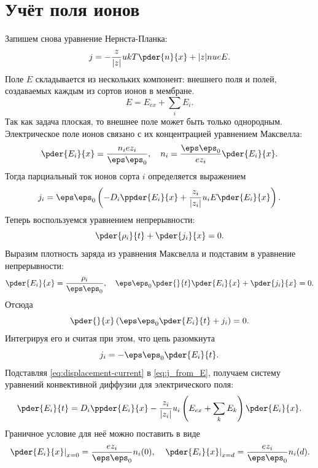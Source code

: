 \documentclass{hedwork}
\begin{document}
\section{Учёт поля ионов}
    Запишем снова уравнение Нернста-Планка:
    \begin{equation}
        j = -\frac{z}{|z|}ukT\pder{n}{x} + |z|nueE.
    \end{equation}
    Поле \( E \) складывается из нескольких компонент: внешнего поля и полей,
    создаваемых каждым из сортов ионов в мембране.
    \begin{equation}
        E = E_{ex} + \sum_{i} E_i.
    \end{equation}
    Так как задача плоская, то внешнее поле может быть только однородным.
    Электрическое поле ионов связано с их концентрацией уравнением Максвелла:
    \begin{equation}
        \pder{E_i}{x} = \frac{n_iez_i}{\eps\eps_0},\quad
        n_i = \frac{\eps\eps_0}{ez_i}\pder{E_i}{x}.
    \end{equation}
    Тогда парциальный ток ионов сорта \( i \) определяется выражением
    \begin{equation}
        j_i = \eps\eps_0
            \left(-D_i\ppder{E_i}{x}+\frac{z_i}{|z_i|}u_iE\pder{E_i}{x}\right).
        \label{eq:j_from_E}
    \end{equation}
    Теперь воспользуемся уравнением непрерывности:
    \begin{equation}
        \pder{\rho_i}{t} + \pder{j_i}{x} = 0.
    \end{equation}
    Выразим плотность заряда из уравнения Максвелла и подставим в уравнение
    непрерывности:
    \begin{equation}
        \pder{E_i}{x} = \frac{\rho_i}{\eps\eps_0},\quad
        \eps\eps_0\pder{}{t}\pder{E_i}{x} + \pder{j_i}{x} = 0.
    \end{equation}
    Отсюда
    \begin{equation}
        \pder{}{x}\left(\eps\eps_0\pder{E_i}{t} + j_i\right) = 0.
    \end{equation}
    Интегрируя его и считая при этом, что цепь разомкнута
    \begin{equation}
        j_i = -\eps\eps_0\pder{E_i}{t}.
        \label{eq:displacement-current}
    \end{equation}
    Подставляя \eqref{eq:displacement-current} в \eqref{eq:j_from_E}, получаем
    систему уравнений конвективной диффузии для электрического поля:
    \begin{equation}
        \pder{E_i}{t} = D_i\ppder{E_i}{x} -
        \frac{z_i}{|z_i|}u_i\left(E_{ex} + \sum_{k} E_k\right)\pder{E_i}{x}.
    \end{equation}
    Граничное условие для неё можно поставить в виде
    \begin{equation}
        \left.\pder{E_i}{x}\right|_{x=0} = \frac{ez_i}{\eps\eps_0}n_i(0),\quad
        \left.\pder{E_i}{x}\right|_{x=d} = \frac{ez_i}{\eps\eps_0}n_i(d).
    \end{equation}
\end{document}
